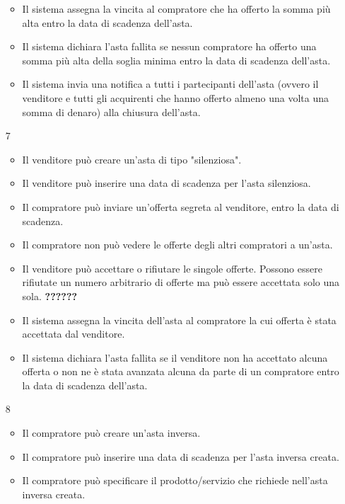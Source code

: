 \begin{itemize}
\begin{itemize}
                \item Il sistema assegna la vincita al compratore che ha offerto la somma più alta entro la data di scadenza dell'asta.
                \item Il sistema dichiara l'asta fallita se nessun compratore ha offerto una somma più alta della soglia minima entro la data di scadenza dell'asta.
                \item Il sistema invia una notifica a tutti i partecipanti dell'asta (ovvero il venditore e tutti gli acquirenti che hanno offerto almeno una volta una somma di denaro) alla chiusura dell'asta.
            \end{itemize} %
            \item[7] 
            \begin{itemize} %
                \item Il venditore può creare un'asta di tipo "silenziosa".
                \item Il venditore può inserire una data di scadenza per l'asta silenziosa.
                \item Il compratore può inviare un'offerta segreta al venditore, entro la data di scadenza.
                \item Il compratore non può vedere le offerte degli altri compratori a un'asta.
                \item Il venditore può accettare o rifiutare le singole offerte. Possono essere rifiutate un numero arbitrario di offerte ma può essere accettata solo una sola. \textbf{??????}
                \item Il sistema assegna la vincita dell'asta al compratore la cui offerta è stata accettata dal venditore.
                \item Il sistema dichiara l'asta fallita se il venditore non ha accettato alcuna offerta o non ne è stata avanzata alcuna da parte di un compratore entro la data di scadenza dell'asta.
            \end{itemize} %
            \item[8]
            \begin{itemize}            
                \item Il compratore può creare un'asta inversa.
                \item Il compratore può inserire una data di scadenza per l'asta inversa creata.
                \item Il compratore può specificare il prodotto/servizio che richiede nell'asta inversa creata.

\end{itemize}
\end{itemize}

